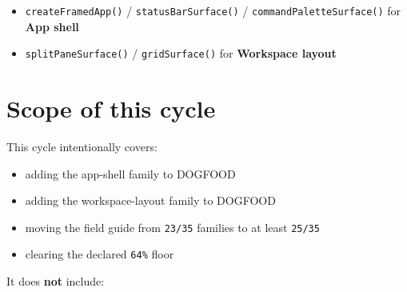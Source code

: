 \begin{itemize}
\tightlist
\item
  \texttt{c\allowbreak{}r\allowbreak{}e\allowbreak{}a\allowbreak{}t\allowbreak{}e\allowbreak{}F\allowbreak{}r\allowbreak{}a\allowbreak{}m\allowbreak{}e\allowbreak{}d\allowbreak{}A\allowbreak{}p\allowbreak{}p\allowbreak{}(\allowbreak{})} / \texttt{s\allowbreak{}t\allowbreak{}a\allowbreak{}t\allowbreak{}u\allowbreak{}s\allowbreak{}B\allowbreak{}a\allowbreak{}r\allowbreak{}S\allowbreak{}u\allowbreak{}r\allowbreak{}f\allowbreak{}a\allowbreak{}c\allowbreak{}e\allowbreak{}(\allowbreak{})} / \texttt{c\allowbreak{}o\allowbreak{}m\allowbreak{}m\allowbreak{}a\allowbreak{}n\allowbreak{}d\allowbreak{}P\allowbreak{}a\allowbreak{}l\allowbreak{}e\allowbreak{}t\allowbreak{}t\allowbreak{}e\allowbreak{}S\allowbreak{}u\allowbreak{}r\allowbreak{}f\allowbreak{}a\allowbreak{}c\allowbreak{}e\allowbreak{}(\allowbreak{})} for \textbf{App shell}
\item
  \texttt{s\allowbreak{}p\allowbreak{}l\allowbreak{}i\allowbreak{}t\allowbreak{}P\allowbreak{}a\allowbreak{}n\allowbreak{}e\allowbreak{}S\allowbreak{}u\allowbreak{}r\allowbreak{}f\allowbreak{}a\allowbreak{}c\allowbreak{}e\allowbreak{}(\allowbreak{})} / \texttt{g\allowbreak{}r\allowbreak{}i\allowbreak{}d\allowbreak{}S\allowbreak{}u\allowbreak{}r\allowbreak{}f\allowbreak{}a\allowbreak{}c\allowbreak{}e\allowbreak{}(\allowbreak{})} for \textbf{Workspace layout}
\end{itemize}

\section{Scope of this cycle}\label{record-076-scope-of-this-cycle}

This cycle intentionally covers:

\begin{itemize}
\tightlist
\item
  adding the app-shell family to DOGFOOD
\item
  adding the workspace-layout family to DOGFOOD
\item
  moving the field guide from \texttt{2\allowbreak{}3\allowbreak{}/\allowbreak{}3\allowbreak{}5} families to at least \texttt{2\allowbreak{}5\allowbreak{}/\allowbreak{}3\allowbreak{}5}
\item
  clearing the declared \texttt{6\allowbreak{}4\allowbreak{}\%} floor
\end{itemize}

It does \textbf{not} include:

